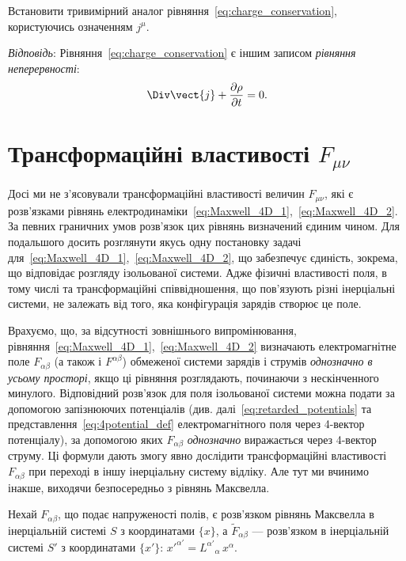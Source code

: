 \begin{problem}
    Встановити тривимірний аналог рівняння~\eqref{eq:charge_conservation}, користуючись означенням $j^{\mu}$.

    \textit{Відповідь}: Рівняння~\eqref{eq:charge_conservation} є іншим записом \emph{рівняння неперервності}:
    \[
        \Div\vect{j} + \frac{\partial\rho}{\partial t} = 0.
    \]
\end{problem}

\section{Трансформаційні властивості \texorpdfstring{$F_{\mu\nu}$}{Fmunu}}

Досі ми не з'ясовували трансформаційні властивості величин $F_{\mu\nu}$, які є розв'язками рівнянь
електродинаміки~\eqref{eq:Maxwell_4D_1},~\eqref{eq:Maxwell_4D_2}. За певних граничних умов розв'язок цих рівнянь
визначений єдиним чином. Для подальшого досить розглянути якусь одну постановку задачі
для~\eqref{eq:Maxwell_4D_1},~\eqref{eq:Maxwell_4D_2}, що забезпечує єдиність, зокрема, що відповідає розгляду
ізольованої системи. Адже фізичні властивості поля, в тому числі та трансформаційні співвідношення, що пов'язують різні
інерціальні системи, не залежать від того, яка конфігурація зарядів створює це поле.

Врахуємо, що, за відсутності зовнішнього випромінювання, рівняння~\eqref{eq:Maxwell_4D_1},~\eqref{eq:Maxwell_4D_2}
визначають електромагнітне поле $F_{\alpha\beta}$ (а також і $F^{\alpha\beta}$) обмеженої системи зарядів і струмів
\emph{однозначно в усьому просторі}, якщо ці рівняння розглядають, починаючи з нескінченного минулого. Відповідний
розв'язок для поля ізольованої системи можна подати за допомогою запізнюючих потенціалів (див.
далі~\eqref{eq:retarded_potentials} та представлення~\eqref{eq:4potential_def} електромагнітного поля через 4-вектор
потенціалу), за допомогою яких $F_{\alpha\beta}$ \emph{однозначно} виражається через 4-вектор струму. Ці формули дають
змогу явно дослідити трансформаційні властивості $F_{\alpha\beta}$ при переході в іншу інерціальну систему відліку. Але
тут ми вчинимо інакше, виходячи безпосередньо з рівнянь Максвелла.

Нехай $F_{\alpha\beta}$, що подає напруженості полів, є розв'язком рівнянь Максвелла в інерціальній системі $S$ з
координатами $\{x\}$, а $\tilde{F}_{\alpha\beta}$ --- розв'язком в інерціальній системі $S'$ з координатами $\{x'\}$:
$x'^{\alpha'} = L^{\alpha'}{}_{\alpha}\,x^{\alpha}$.

